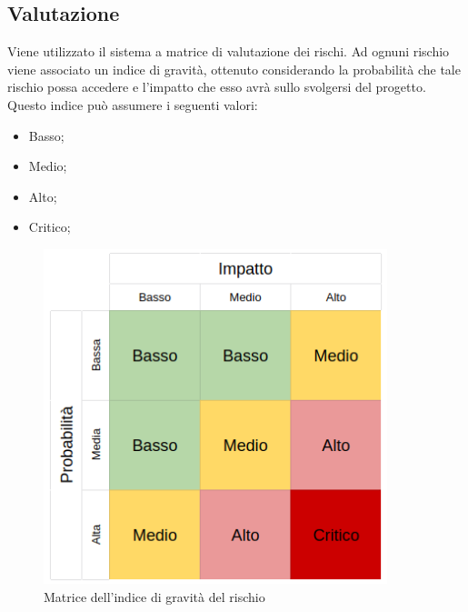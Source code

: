 \documentclass[../piano-di-progetto.tex]{subfiles}
\begin{document}
\subsection{Valutazione}
Viene utilizzato il sistema a matrice di valutazione dei rischi. Ad ognuni rischio viene associato un indice di gravità, ottenuto considerando la probabilità che tale rischio possa accedere e l'impatto che esso avrà sullo svolgersi del progetto. Questo indice può assumere i seguenti valori:
\begin{itemize}
    \item Basso;
    \item Medio;
    \item Alto;
    \item Critico;
\end{itemize}
\begin{figure}[H]
	\centering
	\includegraphics[width=10cm]{img/matrice-rischio.png}
	\caption{Matrice dell'indice di gravità del rischio}
	\label{fig:matrice-rischio}
  \end{figure}
\end{document}

